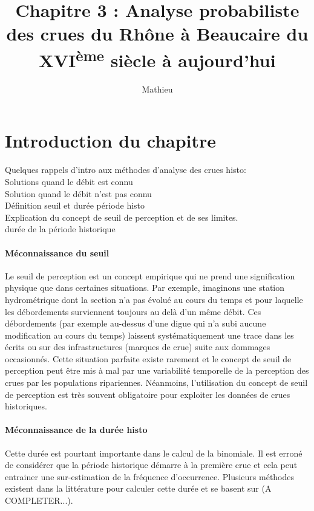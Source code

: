 \documentclass[11pt]{article}
\title{Chapitre 3 : Analyse probabiliste des crues du Rhône à Beaucaire du XVI\textsuperscript{ème} siècle à aujourd'hui}
\author{Mathieu}
\begin{document}
\maketitle

\tableofcontents

\section{Introduction du chapitre}
	Quelques rappels d'intro aux méthodes d'analyse des crues histo:
	\cite{stedinger_flood_1986}\\
	Solutions quand le débit est connu\\
	Solution quand le débit n'est pas connu	\\
	Définition seuil et durée période histo\\
	Explication du concept de seuil de perception et de ses limites.\\
	durée de la période historique\\
	
	\paragraph{Méconnaissance du seuil}
	Le seuil de perception est un concept empirique qui ne prend une signification physique que dans certaines situations. Par exemple, imaginons une station hydrométrique dont la section n'a pas évolué au cours du temps et pour laquelle les débordements surviennent toujours au delà d'un même débit. Ces débordements (par exemple au-dessus d'une digue qui n'a subi aucune modification au cours du temps) laissent systématiquement une trace dans les écrits ou sur des infrastructures (marques de crue) suite aux dommages occasionnés. Cette situation parfaite existe rarement et le concept de seuil de perception peut être mis à mal par une variabilité temporelle de la perception des crues par les populations ripariennes. Néanmoins, l'utilisation du concept de seuil de perception est très souvent obligatoire pour exploiter les données de crues historiques. 
	
	\paragraph{Méconnaissance de la durée histo}Cette durée est pourtant importante dans le calcul de la binomiale. Il est erroné de considérer que la période historique démarre à la première crue et cela peut entrainer une sur-estimation de la fréquence d'occurrence. Plusieurs méthodes existent dans la littérature pour calculer cette durée et se basent sur (A COMPLETER...). 
		
\end{document}
